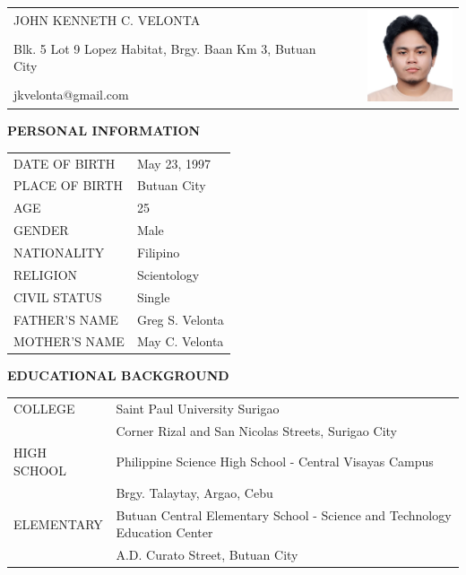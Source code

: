 \documentclass[12pt]{report}
\newcommand{\authorc}{
    John Kenneth C. Velonta %
}
\begin{document}
\begin{spacing}{1.55}
\newpage

\begin{tabularx}{\linewidth}{@{}lXr}
    \MakeUppercase{\authorc} && \multirow{3}{*}{\includegraphics[width=1in]{img/velonta}} \\
    Blk. 5 Lot 9 Lopez Habitat, Brgy. Baan Km 3, Butuan City && \\
    jkvelonta@gmail.com && \\
\end{tabularx}

\vspace{20pt}

\textbf{PERSONAL INFORMATION}

\vspace{-10pt}
\hrulefill

\begin{tabular}{@{}l@{ : }l}
    DATE OF BIRTH & May 23, 1997 \\
    PLACE OF BIRTH & Butuan City\\
    AGE & 25\\
    GENDER & Male \\
    NATIONALITY & Filipino \\
    RELIGION & Scientology \\
    CIVIL STATUS & Single \\
    FATHER'S NAME & Greg S. Velonta\\
    MOTHER'S NAME & May C. Velonta\\
\end{tabular}

\vspace{20pt}

\textbf{EDUCATIONAL BACKGROUND}

\vspace{-10pt}
\hrulefill

\begin{tabular}{@{}l@{ : }l}
    COLLEGE & Saint Paul University Surigao \\
    & Corner Rizal and San Nicolas Streets, Surigao City \\
    HIGH SCHOOL & Philippine Science High School - Central Visayas Campus\\
    & Brgy. Talaytay, Argao, Cebu \\
    ELEMENTARY & Butuan Central Elementary School - Science and Technology Education Center \\
    & A.D. Curato Street, Butuan City \\
\end{tabular}


\end{spacing}
\end{document}
